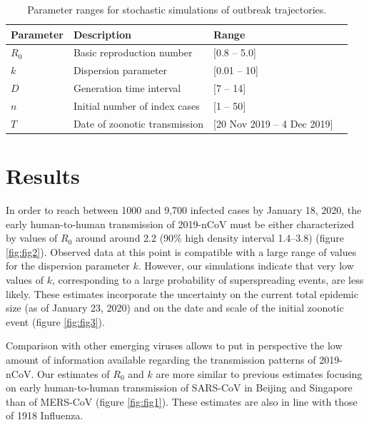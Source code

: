 \documentclass{article}
\begin{document}
\begin{table}
	\centering
	\caption{Parameter ranges for stochastic simulations of outbreak trajectories.}
	\label{fig:tab1}
\begin{tabular}{llll}
	\hline
	Parameter & Description & Range   \\
	\hline 
	$R_0$& Basic reproduction number  &[0.8 -- 5.0] \\ 
	$k$ & Dispersion parameter & [0.01 -- 10] \\
	$D$ & Generation time interval & [7 -- 14]  \\
	$n$ & Initial number of index cases & [1 -- 50]  \\
	$T$ & Date of zoonotic transmission & [20 Nov 2019 -- 4 Dec 2019] \\
	
	\hline 
\end{tabular} 
\end{table}

\section{Results}
In order to reach between 1000 and 9,700 infected cases by January 18, 2020, the early human-to-human transmission of 2019-nCoV must be either characterized by values of $R_0$ around around 2.2 (90\% high density interval 1.4--3.8) (figure \ref{fig:fig2}).
Observed data at this point is compatible with a large range of values for the dispersion parameter $k$. 
However, our simulations indicate that very low values of $k$, corresponding to a large probability of superspreading events, are less likely.
These estimates incorporate the uncertainty on the current total epidemic size (as of January 23, 2020) and on the date and scale of the initial zoonotic event (figure \ref{fig:fig3}).

Comparison with other emerging viruses allows to put in perspective the low amount of information available regarding the transmission patterns of 2019-nCoV.
Our estimates of $R_0$ and $k$ are more similar to previous estimates focusing on early human-to-human transmission of SARS-CoV in Beijing and Singapore\cite{Lloyd-Smith:2005} than of MERS-CoV\cite{Kucharski:2015b} (figure \ref{fig:fig1}).
These estimates are also in line with those of 1918 Influenza.\cite{Fraser:2011}


\end{document}
